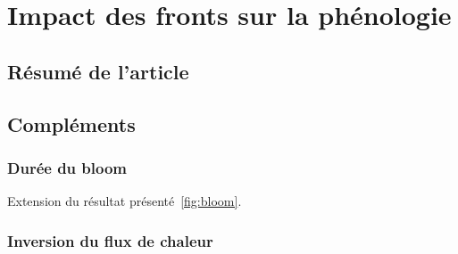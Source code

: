 
\chapter{Impact des fronts sur la phénologie}
\addChpLof
\label{chp:res-phenologie}
\graphicspath{{resources/res_phénologie}}

\minitoc%
\clearpage

\section{Résumé de l'article}
\label{sec:resume-res-phenologie}

\section{Compléments}
\label{sec:complements-phenologie}

\subsection{Durée du bloom}
\label{sec:duree-bloom}

Extension du résultat présenté~\cref{fig:bloom}.

\begin{figure}
  \centering
  \label{fig:duree-bloom}
\end{figure}

\subsection{Inversion du flux de chaleur}
\label{sec:flux-chaleur}

